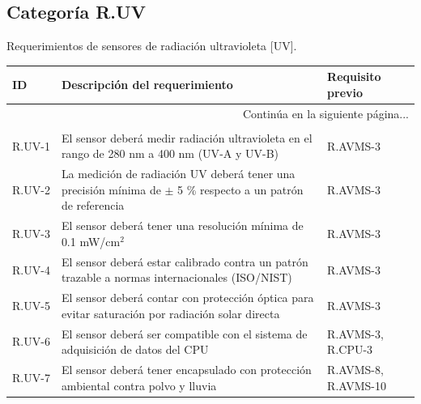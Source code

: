 \documentclass{article}%
\begin{document}
\subsection{Categoría R.UV}%
\label{subsec:CategoraR.UV}%
Requerimientos de sensores de radiación ultravioleta [UV].\newline%
\newline%
%
\begin{longtable}{|p{2cm}|p{9cm}|p{2.5cm}|}%
\hline%
ID&Descripción del requerimiento&Requisito previo\\%
\hline%
\endhead%
\hline%
\multicolumn{3}{|r|}{Continúa en la siguiente página...}\\%
\hline%
\endfoot%
\hline%
\multicolumn{3}{|r|}{Fin de la tabla}\\%
\hline%
\endlastfoot%
R.UV{-}1& El sensor deberá medir radiación ultravioleta en el rango de 280 nm a 400 nm (UV{-}A y UV{-}B)& R.AVMS{-}3\\%
\hline%
R.UV{-}2& La medición de radiación UV deberá tener una precisión mínima de $\pm$ 5 \% respecto a un patrón de referencia& R.AVMS{-}3\\%
\hline%
R.UV{-}3& El sensor deberá tener una resolución mínima de 0.1 mW/cm$^2$ & R.AVMS{-}3\\%
\hline%
R.UV{-}4& El sensor deberá estar calibrado contra un patrón trazable a normas internacionales (ISO/NIST)& R.AVMS{-}3\\%
\hline%
R.UV{-}5& El sensor deberá contar con protección óptica para evitar saturación por radiación solar directa& R.AVMS{-}3\\%
\hline%
R.UV{-}6& El sensor deberá ser compatible con el sistema de adquisición de datos del CPU& R.AVMS{-}3, R.CPU{-}3\\%
\hline%
R.UV{-}7& El sensor deberá tener encapsulado con protección ambiental contra polvo y lluvia& R.AVMS{-}8, R.AVMS{-}10\\%
\hline%
\end{longtable}

%
\newpage%
\end{document}
